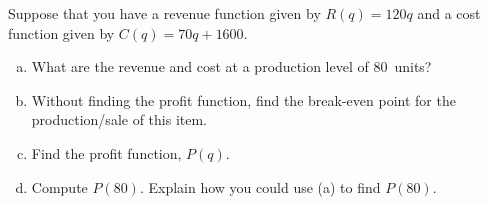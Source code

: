 \documentclass[11pt,letterpaper]{article}
\begin{document}
\newpage



 Suppose that you have a revenue function given by $R(q)= 120q$ and a cost function given by $C(q)= 70q + 1600$. 
	\begin{enumerate}[(a)]
	\item What are the revenue and cost at a production level of 80~units?
	\item Without finding the profit function, find the break-even point for the production/sale of this item.
	\item Find the profit function, $P(q)$.
	\item Compute $P(80)$. Explain how you could use (a) to find $P(80)$. 
	\end{enumerate}
\end{document}
